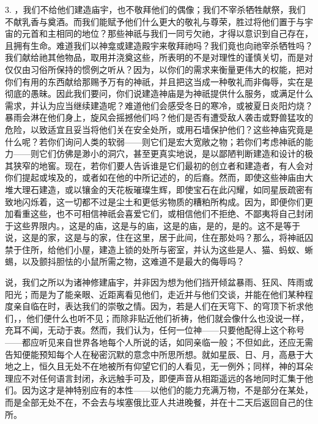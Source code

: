 3. ，我们不给他们建造庙宇，也不敬拜他们的偶像；我们不宰杀牺牲献祭，我们不献乳香与奠酒。而我们能赋予他们什么更大的敬礼与尊荣，胜过将他们置于与宇宙的元首和主相同的地位？那些神祇与我们一同亏欠祂，才得以意识到自己存在，且拥有生命。难道我们以神龛或建造殿宇来敬拜祂吗？我们竟也向祂宰杀牺牲吗？我们献给祂其他物品，取用并浇奠这些，所表明的不是对理性的谨慎关切，而是对仅仅由习俗所保持的惯例之听从？因为，以你们的需求来衡量更伟大的权能，把对你们有用的东西献给那赐予万有的神祇，并且把这当成一种敬礼而非侮辱，实在是彻底的愚昧。因此我们要问，你们说建造神庙是为神祇提供什么服务，或满足什么需求，并认为应当继续建造呢？难道他们会感受冬日的寒冷，或被夏日炎阳灼烧？暴雨会淋在他们身上，旋风会摇撼他们吗？他们是否有遭受敌人袭击或野兽猛攻的危险，以致适宜且妥当将他们关在安全处所，或用石墙保护他们？这些神庙究竟是什么呢？若你们询问人类的软弱——则它们是宏大宽敞之物；若你们考虑神祇的能力——则它们仿佛是渺小的洞穴，甚至更真实地说，是以鄙陋判断建造和设计的极其狭窄的地窖。现在，若你们要人告诉谁是它们最初的创立者和建造者，有人会对你们提起或埃及的，或者如在他的中所记述的，的后裔。然而，即使这些神庙由大堆大理石建造，或以镶金的天花板璀璨生辉，即使宝石在此闪耀，如同星辰疏密有致地闪烁着，这一切都不过是尘土和更低劣物质的糟粕所构成。因为，即便你们更加看重这些，也不可相信神祇会喜爱它们，或相信他们不拒绝、不鄙夷将自己封闭于这些界限内。，这是的庙，这是与的庙，这是的庙，是的，是的。这不是等于说，这是的家，这是与的家，住在这里，居于此间，住在那处吗？那么，将神祇囚禁于住所，给他们小屋，建造上锁的处所与密室，并认为这些是人、猫、蚂蚁、蜥蜴，以及颤抖胆怯的小鼠所需之物，这难道不是最大的侮辱吗？\par

说，我们之所以为诸神修建庙宇，并非因为想为他们挡开倾盆暴雨、狂风、阵雨或阳光；而是为了能亲眼、近距离看见他们，走近并与他们交谈，并能在他们某种程度亲自临在时，表达我们的崇敬之情。因为，若是人们在天穹下、的穹顶下祈求他们，，他们便什么也听不见；而除非贴近他们祈祷，他们就会像什么也没说一样，充耳不闻，无动于衷。然而，我们认为，任何一位神——只要他配得上这个称号——都应听见来自世界各地每个人所说的话，如同亲临一般；不但如此，还应无需告知便能预知每个人在秘密沉默的意念中所思所想。就如星辰、日、月，高悬于大地之上，恒久且无处不在地被所有仰望它们的人看见，无一例外；同样，神的耳朵理应不对任何语言封闭，永远触手可及，即便声音从相距遥远的各地同时汇集于他们。因为这才是神特别应有的本性——以他们的能力充满万物，不是部分在某处，而是全部无处不在，不会去与埃塞俄比亚人共进晚餐，并在十二天后返回自己的住所。\par


